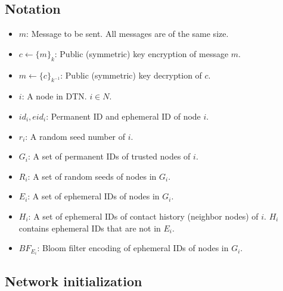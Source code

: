 \documentclass[11pt]{article}
\begin{document}
\subsection{Notation}
\begin{itemize}
\item $m$: Message to be sent. All messages are of the same size.
\item $c \leftarrow \{m\}_{k}$: Public (symmetric) key encryption of message $m$.
\item $m \leftarrow \{c\}_{k^{-1}}$: Public (symmetric) key decryption of $c$.

\item $i$: A node in DTN. $i \in N$.
\item $id_i, eid_i$: Permanent ID and ephemeral ID of node $i$.
\item $r_i$: A random seed number of $i$.

\item $G_i$: A set of permanent IDs of trusted nodes of $i$.
\item $R_i$: A set of random seeds of nodes in $G_i$.
\item $E_i$: A set of ephemeral IDs of nodes in $G_i$. %
\item $H_i$: A set of ephemeral IDs of contact history (neighbor nodes) of $i$. $H_i$ contains ephemeral IDs that are not in $E_i$. %
\item $BF_{E_i}$: Bloom filter encoding of ephemeral IDs of nodes in $G_i$.
\end{itemize}


\subsection{Network initialization}
\end{document}
